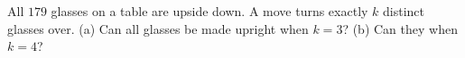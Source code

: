 All $179$ glasses on a table are upside down. A move turns exactly $k$ distinct glasses over. (a) Can all glasses be made upright when $k=3$? (b) Can they when $k=4$?
